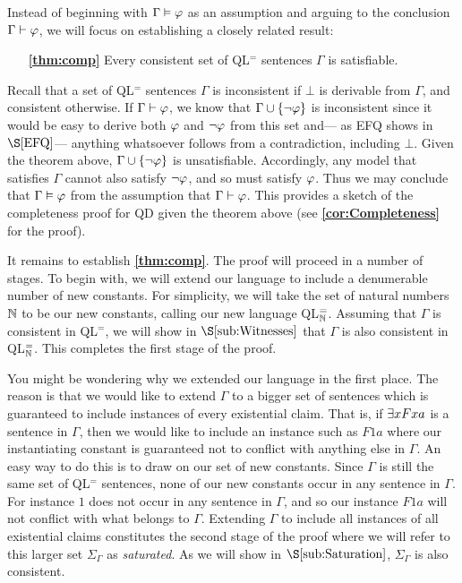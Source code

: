Instead of beginning with $\Gamma\vDash\varphi$ as an assumption and arguing to the conclusion $\Gamma\vdash\varphi$, we will focus on establishing a closely related result: 
\begin{enumerate}[leftmargin=1.5in]
  \item[\textbf{\ref{thm:comp}}] Every consistent set of QL$^=$ sentences $\Gamma$ is satisfiable. 
\end{enumerate}
Recall that a set of QL$^=$ sentences $\Gamma$ is inconsistent if $\bot$ is derivable from $\Gamma$, and consistent otherwise.
If $\Gamma\vdash\varphi$, we know that $\Gamma\cup\lbrace\neg\varphi\rbrace$ is inconsistent since it would be easy to derive both $\varphi$ and $\neg\varphi$ from this set and--- as EFQ shows in $\S\ref{EFQ}$--- anything whatsoever follows from a contradiction, including $\bot$.
Given the theorem above, $\Gamma\cup\lbrace\neg\varphi\rbrace$ is unsatisfiable. 
Accordingly, any model that satisfies $\Gamma$ cannot also satisfy $\neg\varphi$, and so must satisfy $\varphi$. 
Thus we may conclude that $\Gamma\vDash\varphi$ from the assumption that $\Gamma\vdash\varphi$. 
This provides a sketch of the completeness proof for QD given the theorem above (see \textbf{\ref{cor:Completeness}} for the proof).

It remains to establish \textbf{\ref{thm:comp}}.
The proof will proceed in a number of stages.
To begin with, we will extend our language to include a denumerable number of new constants.
For simplicity, we will take the set of natural numbers $\mathbb{N}$ to be our new constants, calling our new language QL$^=_{\mathbb{N}}$. 
Assuming that $\Gamma$ is consistent in QL$^=$, we will show in $\S\ref{sub:Witnesses}$ that $\Gamma$ is also consistent in QL$^=_{\mathbb{N}}$.
This completes the first stage of the proof.

You might be wondering why we extended our language in the first place.
The reason is that we would like to extend $\Gamma$ to a bigger set of sentences which is guaranteed to include instances of every existential claim. 
That is, if $\exists xFxa$ is a sentence in $\Gamma$, then we would like to include an instance such as $F1a$ where our instantiating constant is guaranteed not to conflict with anything else in $\Gamma$.
An easy way to do this is to draw on our set of new constants.
Since $\Gamma$ is still the same set of QL$^=$ sentences, none of our new constants occur in any sentence in $\Gamma$.
For instance $1$ does not occur in any sentence in $\Gamma$, and so our instance $F1a$ will not conflict with what belongs to $\Gamma$. 
Extending $\Gamma$ to include all instances of all existential claims constitutes the second stage of the proof where we will refer to this larger set $\Sigma_\Gamma$ as \textit{saturated}. 
As we will show in $\S\ref{sub:Saturation}$, $\Sigma_\Gamma$ is also consistent. 


